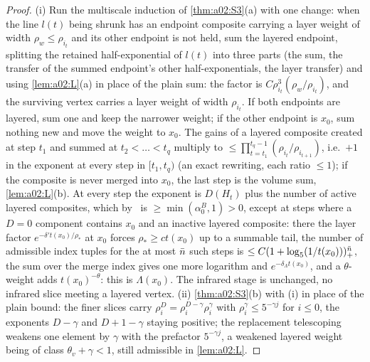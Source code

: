 \begin{proof}
(i) Run the multiscale induction of \cref{thm:a02:S3}(a) with one change: when the line $l(t)$ being shrunk has an endpoint composite carrying a layer weight of width $\rho_w\le\rho_{i_t}$ and its other endpoint is not held, sum the layered endpoint, splitting the retained half-exponential of $l(t)$ into three parts (the sum, the transfer of the summed endpoint's other half-exponentials, the layer transfer) and using \cref{lem:a02:L}(a) in place of the plain sum: the factor is $C\rho_{i_t}^3(\rho_w/\rho_{i_t})$, and the surviving vertex carries a layer weight of width $\rho_{i_t}$. If both endpoints are layered, sum one and keep the narrower weight; if the other endpoint is $x_0$, sum nothing new and move the weight to $x_0$. The gains of a layered composite created at step $t_1$ and summed at $t_2<\dots<t_q$ multiply to $\le\prod_{t=t_1}^{t_q-1}(\rho_{i_t}/\rho_{i_{t+1}})$, i.e.\ $+1$ in the exponent at every step in $[t_1,t_q)$ (an exact rewriting, each ratio $\le1$); if the composite is never merged into $x_0$, the last step is the volume sum, \cref{lem:a02:L}(b). At every step the exponent is $D(H_t)$ plus the number of active layered composites, which by \DEGB\ is $\ge\min(\alpha_0^B,1)>0$, except at steps where a $D=0$ component contains $x_0$ and an inactive layered composite: there the layer factor $e^{-\delta't(x_0)/\rho_*}$ at $x_0$ forces $\rho_*\ge ct(x_0)$ up to a summable tail, the number of admissible index tuples for the at most $\bar n$ such steps is $\le C(1+\log_5(1/t(x_0)))_+^{\bar n}$, the sum over the merge index gives one more logarithm and $e^{-\delta_\Lambda t(x_0)}$, and a $\theta$-weight adds $t(x_0)^{-\theta}$: this is $\Lambda(x_0)$. The infrared stage is unchanged, no infrared slice meeting a layered vertex. (ii) \cref{thm:a02:S3}(b) with (i) in place of the plain bound: the finer slices carry $\rho_i^{D}=\rho_i^{D-\gamma}\rho_i^\gamma$ with $\rho_i^\gamma\le5^{-\gamma j}$ for $i\le0$, the exponents $D-\gamma$ and $D+1-\gamma$ staying positive; the replacement telescoping weakens one element by $\gamma$ with the prefactor $5^{-\gamma j}$, a weakened layered weight being of class $\theta_v+\gamma<1$, still admissible in \cref{lem:a02:L}.
\end{proof}

